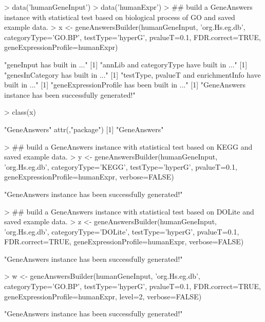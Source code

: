 \documentclass[a4paper]{article}
\begin{document}
\begin{Schunk}
\begin{Sinput}
> data('humanGeneInput')
> data('humanExpr')
> ## build a GeneAnswers instance with statistical test based on biological process of GO and saved example data.
> x <- geneAnswersBuilder(humanGeneInput, 'org.Hs.eg.db', categoryType='GO.BP', testType='hyperG', pvalueT=0.1, FDR.correct=TRUE, geneExpressionProfile=humanExpr)
\end{Sinput}
\begin{Soutput}
[1] "geneInput has built in ..."
[1] "annLib and categoryType have built in ..."
[1] "genesInCategory has built in ..."
[1] "testType, pvalueT and enrichmentInfo have built in ..."
[1] "geneExpressionProfile has been built in ..."
[1] "GeneAnswers instance has been successfully generated!"
\end{Soutput}
\begin{Sinput}
> class(x)
\end{Sinput}
\begin{Soutput}
[1] "GeneAnswers"
attr(,"package")
[1] "GeneAnswers"
\end{Soutput}
\begin{Sinput}
> ## build a GeneAnswers instance with statistical test based on KEGG and saved example data. 
> y <- geneAnswersBuilder(humanGeneInput, 'org.Hs.eg.db', categoryType='KEGG', testType='hyperG', pvalueT=0.1, geneExpressionProfile=humanExpr, verbose=FALSE)
\end{Sinput}
\begin{Soutput}
[1] "GeneAnswers instance has been successfully generated!"
\end{Soutput}
\begin{Sinput}
> ## build a GeneAnswers instance with statistical test based on DOLite and saved example data.
> z <- geneAnswersBuilder(humanGeneInput, 'org.Hs.eg.db', categoryType='DOLite', testType='hyperG', pvalueT=0.1, FDR.correct=TRUE, geneExpressionProfile=humanExpr, verbose=FALSE)
\end{Sinput}
\begin{Soutput}
[1] "GeneAnswers instance has been successfully generated!"
\end{Soutput}
\begin{Sinput}
> w <- geneAnswersBuilder(humanGeneInput, 'org.Hs.eg.db', categoryType='GO.BP', testType='hyperG', pvalueT=0.1, FDR.correct=TRUE, geneExpressionProfile=humanExpr, level=2, verbose=FALSE) 
\end{Sinput}
\begin{Soutput}
[1] "GeneAnswers instance has been successfully generated!"
\end{Soutput}
\end{Schunk}
\end{document}

